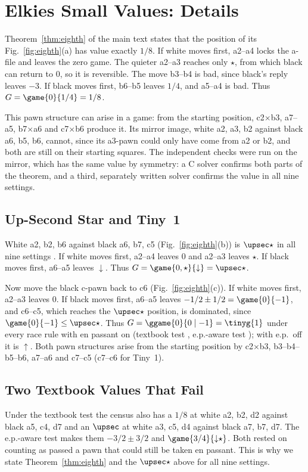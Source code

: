 \section{Elkies\textquotesingle{} Small Values: Details}\label{S-targets}
Theorem~\ref{thm:eighth} of the main text states that the position of its Fig.~\ref{fig:eighth}(a) has value exactly $1/8$.
If white moves first, a2--a4 locks the a-file and leaves the
zero game. The quieter a2--a3 reaches only $\star$, from which black can return to $0$, so it is reversible.
The move b3--b4 is bad, since black's reply leaves $-3$. If black moves first, b6--b5 leaves $1/4$, and
a5--a4 is bad. Thus $G=\game{0}{1/4}=1/8$.

This pawn structure can arise in a game: from the starting position, c2$\times$b3, a7--a5, b7$\times$a6 and
c7$\times$b6 produce it. Its mirror image, white a2, a3, b2 against black a6, b5, b6, cannot, since its
a3-pawn could only have come from a2 or b2, and both are still on their starting squares. The independent
checks were run on the mirror, which has the same value by symmetry: a C solver confirms both parts of the
theorem, and a third, separately written solver confirms the value in all nine settings.

\subsection{Up-Second Star and Tiny~1}
White a2, b2, b6 against black a6, b7, c5 (Fig.~\ref{fig:eighth}(b)) is $\upsec\star$ in all nine settings
. If white moves first, a2--a4 leaves $0$ and a2--a3 leaves $\star$. If black moves first, a6--a5
leaves ${\downarrow}$. Thus $G=\game{0,\star}{{\downarrow}}=\upsec\star$.

Now move the black c-pawn back to c6 (Fig.~\ref{fig:eighth}(c)). If white moves first, a2--a3 leaves $0$.
If black moves first, a6--a5 leaves $-1/2\pm1/2=\game{0}{-1}$, and c6--c5, which reaches the $\upsec\star$
position, is dominated, since $\game{0}{-1}\le\upsec\star$. Thus $G=\ggame{0}{0\mid -1}=\tinyg{1}$ under
every race rule with en passant on (textbook test , e.p.-aware test ); with e.p.\ off it is
${\uparrow}$. Both pawn structures
arise from the starting position by c2$\times$b3, b3--b4--b5--b6, a7--a6 and c7--c5 (c7--c6 for Tiny~1).

\subsection{Two Textbook Values That Fail}
Under the textbook test the census also has a $1/8$ at white a2, b2, d2 against black a5, c4, d7 and an
$\upsec$ at white a3, c5, d4 against black a7, b7, d7. The e.p.-aware test makes them $-3/2\pm3/2$ and
$\game{3/4}{{\downarrow}\star}$. Both rested on counting as passed a pawn that
could still be taken en passant. This is why we state Theorem~\ref{thm:eighth} and the $\upsec\star$ above for
all nine settings.
